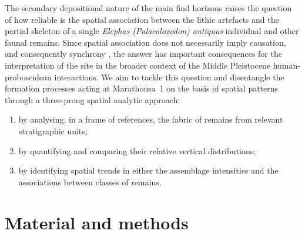 \documentclass[review,authoryear,times]{elsarticle} %
\begin{document}
The secondary depositional nature of the main find horizons raises the question of how reliable is the spatial association between the lithic artefacts and the partial skeleton of a single \emph{Elephas (Palaeoloxodon) antiquus} individual and other faunal remains. Since spatial association does not necessarily imply causation, and consequently synchrony \citep{Binford1981a,Binford1987}, the answer has important consequences for the interpretation of the site in the broader context of the Middle Pleistocene human-proboscidean interactions. We aim to tackle this question and disentangle the formation processes acting at Marathousa~1 on the basis of spatial patterns through a three-prong spatial analytic approach:
\begin{enumerate}
\item by analysing, in a frame of references, the fabric of remains from relevant stratigraphic units;
\item by quantifying and comparing their relative vertical distributions;
\item by identifying spatial trends in either the assemblage intensities and the associations between classes of remains.
\end{enumerate}


\section{Material and methods}
\end{document}
